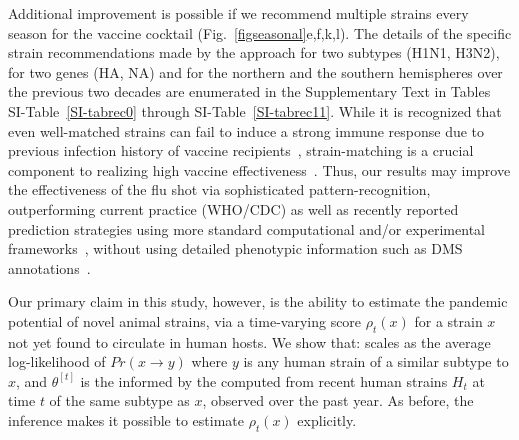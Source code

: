 \documentclass[onecolumn, compsoc,10pt]{IEEEtran}
\begin{document}
Additional improvement is possible if we recommend multiple strains every season for the vaccine cocktail (Fig.~\ref{figseasonal}e,f,k,l). The details of the specific strain  recommendations made by the \enet approach for two subtypes (H1N1, H3N2), for two genes (HA, NA) and for the northern and the southern hemispheres over the previous two decades are enumerated in the Supplementary Text in Tables SI-Table~\ref{SI-tabrec0} through SI-Table~\ref{SI-tabrec11}. While it is recognized that even well-matched strains can fail to induce a strong immune response due to previous infection history of vaccine recipients~\cite{cobey2018poor}, strain-matching is a crucial component to realizing high vaccine effectiveness~\cite{gouma2020antigenic}. Thus, our results may improve the effectiveness of the flu shot via sophisticated  pattern-recognition, outperforming current practice (WHO/CDC) as well as  recently reported prediction strategies  using more standard computational and/or experimental frameworks~\cite{huddleston2020integrating,neher2014predicting},  without using  detailed phenotypic information such as DMS annotations~\cite{huddleston2020integrating,neher2014predicting}.


Our primary claim in this study, however,  is the ability to estimate the pandemic potential of novel animal strains, via a  time-varying \erisk score $\rho_t(x)$ for a strain $x$ not yet found to circulate in human hosts. We show that:%
%
scales as the average log-likelihood of $Pr(x \rightarrow y)$ where $y$ is any human strain of a similar subtype to $x$, and  $\theta^{[t]}$ is the \qdist informed by the \enet computed from recent human strains $H_t$ at time $t$ of the same subtype as $x$, observed over the past year. As before, the \enet inference makes it possible to estimate $\rho_t(x)$ explicitly. 
\end{document}
